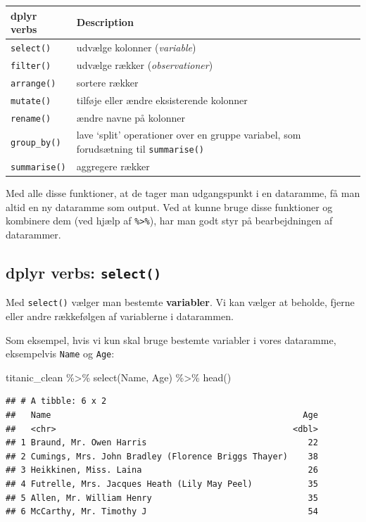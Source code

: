 \documentclass[
]{book}
\newenvironment{Shaded}{\begin{snugshade}}{\end{snugshade}}
\newcommand{\FunctionTok}[1]{\textcolor[rgb]{0.00,0.00,0.00}{#1}}
\newcommand{\NormalTok}[1]{#1}
\newcommand{\SpecialCharTok}[1]{\textcolor[rgb]{0.00,0.00,0.00}{#1}}
\begin{document}
\begin{longtable}[]{@{}
  >{\raggedright\arraybackslash}p{}
  >{\raggedright\arraybackslash}p{}@{}}
\toprule
dplyr verbs & Description \\
\midrule
\endhead
\texttt{select()} & udvælge kolonner (\emph{variable}) \\
\texttt{filter()} & udvælge rækker (\emph{observationer}) \\
\texttt{arrange()} & sortere rækker \\
\texttt{mutate()} & tilføje eller ændre eksisterende kolonner \\
\texttt{rename()} & ændre navne på kolonner \\
\texttt{group\_by()} & lave `split' operationer over en gruppe variabel, som forudsætning til \texttt{summarise()} \\
\texttt{summarise()} & aggregere rækker \\
\bottomrule
\end{longtable}

Med alle disse funktioner, at de tager man udgangspunkt i en dataramme, få man altid en ny dataramme som output. Ved at kunne bruge disse funktioner og kombinere dem (ved hjælp af \texttt{\%\textgreater{}\%}), har man godt styr på bearbejdningen af datarammer.

\hypertarget{dplyr-verbs-select}{%
\subsection{\texorpdfstring{dplyr verbs: \texttt{select()}}{dplyr verbs: select()}}\label{dplyr-verbs-select}}

Med \texttt{select()} vælger man bestemte \textbf{variabler}. Vi kan vælger at beholde, fjerne eller andre rækkefølgen af variablerne i datarammen.

Som eksempel, hvis vi kun skal bruge bestemte variabler i vores dataramme, eksempelvis \texttt{Name} og \texttt{Age}:

\begin{Shaded}
\begin{Highlighting}[]
\NormalTok{titanic\_clean }\SpecialCharTok{\%\textgreater{}\%} 
  \FunctionTok{select}\NormalTok{(Name, Age) }\SpecialCharTok{\%\textgreater{}\%}
  \FunctionTok{head}\NormalTok{()}
\end{Highlighting}
\end{Shaded}

\begin{verbatim}
## # A tibble: 6 x 2
##   Name                                                  Age
##   <chr>                                               <dbl>
## 1 Braund, Mr. Owen Harris                                22
## 2 Cumings, Mrs. John Bradley (Florence Briggs Thayer)    38
## 3 Heikkinen, Miss. Laina                                 26
## 4 Futrelle, Mrs. Jacques Heath (Lily May Peel)           35
## 5 Allen, Mr. William Henry                               35
## 6 McCarthy, Mr. Timothy J                                54
\end{verbatim}
\end{document}
